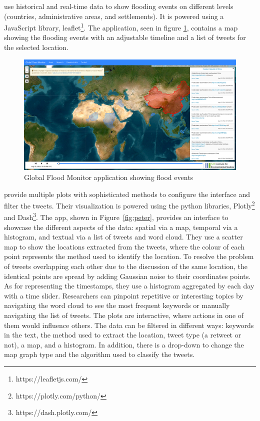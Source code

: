  use historical and real-time data to show flooding
events on different levels (countries, administrative areas, and settlements). It is powered using a
JavaScript library, leaflet\footnote{https://leafletjs.com/}. The application, seen in figure
\ref{fig:global}, contains a map showing the flooding events with an adjustable timeline and a list
of tweets for the selected location.


\begin{figure}[H]
\begin{center}
  \includegraphics[width=\columnwidth]{images/global.png}
\end{center}
\caption{Global Flood Monitor application showing flood events}
\label{fig:global}
\end{figure}

 provide multiple plots with sophisticated
methods to configure the interface and filter the tweets. Their visualization is powered using the python
libraries, Plotly\footnote{https://plotly.com/python/} and Dash\footnote{https://dash.plotly.com/}.
The app, shown in Figure~\ref{fig:peter}, provides an interface to showcase the different aspects of the
data: spatial via a map, temporal via a histogram, and textual via a list of tweets and word cloud.
They use a scatter map to show the locations extracted from the tweets, where the colour of each
point represents the method used to identify the location. To resolve the problem of tweets
overlapping each other due to the discussion of the same location, the identical points are
spread by adding Gaussian noise to their coordinates points. As for representing the timestamps,
they use a histogram aggregated by each day with a time slider. Researchers can pinpoint repetitive
or interesting topics by navigating the word cloud to see the most frequent keywords or manually
navigating the list of tweets. The plots are interactive, where actions in one of them would
influence others. The data can be filtered in different ways: keywords in the text, the method used
to extract the location, tweet type (a retweet or not), a map, and a histogram. In addition, there is a
drop-down to change the map graph type and the algorithm used to classify the tweets.

